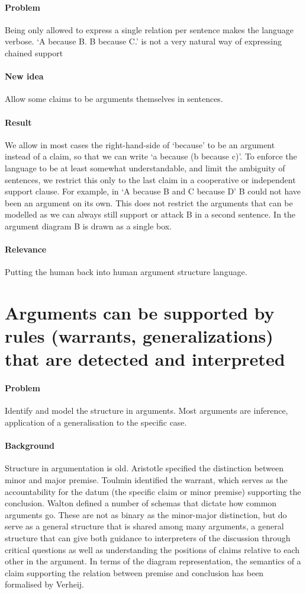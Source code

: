 \documentclass{article}
\let\stdsection\section
\renewcommand\section{\newpage\stdsection}
\begin{document}
\paragraph{Problem} Being only allowed to express a single relation per sentence makes the language verbose. `A because B. B because C.' is not a very natural way of expressing chained support
\paragraph{New idea} Allow some claims to be arguments themselves in sentences.
\paragraph{Result} We allow in most cases the right-hand-side of `because' to be an argument instead of a claim, so that we can write `a because (b because c)'. To enforce the language to be at least somewhat understandable, and limit the ambiguity of sentences, we restrict this only to the last claim in a cooperative or independent support clause. For example, in `A because B and C because D' B could not have been an argument on its own. This does not restrict the arguments that can be modelled as we can always still support or attack B in a second sentence. In the argument diagram B is drawn as a single box.
\paragraph{Relevance} Putting the human back into human argument structure language.

\section{Arguments can be supported by rules (warrants, generalizations) that are detected and interpreted}

\paragraph{Problem} Identify and model the structure in arguments. Most arguments are inference, application of a generalisation to the specific case.
\paragraph{Background} Structure in argumentation is old. Aristotle specified the distinction between minor and major premise. Toulmin identified the warrant, which serves as the accountability for the datum (the specific claim or minor premise) supporting the conclusion. Walton defined a number of schemas that dictate how common arguments go. These are not as binary as the minor-major distinction, but do serve as a general structure that is shared among many arguments, a general structure that can give both guidance to interpreters of the discussion through critical questions as well as understanding the positions of claims relative to each other in the argument. In terms of the diagram representation, the semantics of a claim supporting the relation between premise and conclusion has been formalised by Verheij. 
\end{document}
